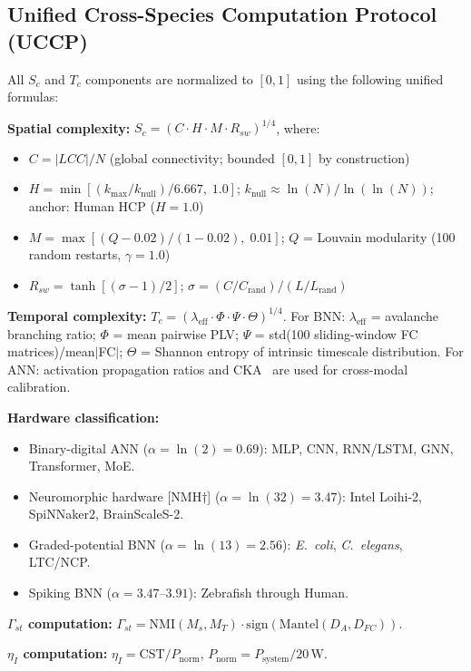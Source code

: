 \documentclass[12pt]{article}
\newcommand{\CST}{\mathrm{CST}}
\newcommand{\Sc}{S_c}
\newcommand{\Tc}{T_c}
\newcommand{\Gst}{\Gamma_{st}}
\newcommand{\etaI}{\eta_I}
\begin{document}
\subsection{Unified Cross-Species Computation Protocol (UCCP)}

All $\Sc$ and $\Tc$ components are normalized to $[0, 1]$ using the following unified formulas:

\textbf{Spatial complexity:} $\Sc = (C \cdot H \cdot M \cdot R_{sw})^{1/4}$, where:
\begin{itemize}
\item $C = |LCC|/N$ (global connectivity; bounded $[0,1]$ by construction)
\item $H = \min[(k_{\max} / k_{\mathrm{null}}) / 6.667,\; 1.0]$; $k_{\mathrm{null}} \approx \ln(N)/\ln(\ln(N))$; anchor: Human HCP ($H = 1.0$)
\item $M = \max[(Q - 0.02) / (1 - 0.02),\; 0.01]$; $Q$ = Louvain modularity (100 random restarts, $\gamma = 1.0$)
\item $R_{sw} = \tanh[(\sigma - 1) / 2]$; $\sigma = (C/C_{\mathrm{rand}})/(L/L_{\mathrm{rand}})$
\end{itemize}

\textbf{Temporal complexity:} $\Tc = (\lambda_{\mathrm{eff}} \cdot \Phi \cdot \Psi \cdot \Theta)^{1/4}$. For BNN: $\lambda_{\mathrm{eff}}$ = avalanche branching ratio; $\Phi$ = mean pairwise PLV; $\Psi$ = std(100 sliding-window FC matrices)/mean$|$FC$|$; $\Theta$ = Shannon entropy of intrinsic timescale distribution. For ANN: activation propagation ratios and CKA~\cite{raghu2021} are used for cross-modal calibration.

\textbf{Hardware classification:}
\begin{itemize}
\item Binary-digital ANN ($\alpha = \ln(2) = 0.69$): MLP, CNN, RNN/LSTM, GNN, Transformer, MoE.
\item Neuromorphic hardware [NMH$\dagger$] ($\alpha = \ln(32) = 3.47$): Intel Loihi-2, SpiNNaker2, BrainScaleS-2.
\item Graded-potential BNN ($\alpha = \ln(13) = 2.56$): \textit{E.\ coli}, \textit{C.\ elegans}, LTC/NCP.
\item Spiking BNN ($\alpha = 3.47$--$3.91$): Zebrafish through Human.
\end{itemize}

\textbf{$\Gst$ computation:} $\Gst = \mathrm{NMI}(M_s, M_T) \cdot \mathrm{sign}(\mathrm{Mantel}(D_A, D_{FC}))$.

\textbf{$\etaI$ computation:} $\etaI = \CST / P_{\mathrm{norm}}$, $P_{\mathrm{norm}} = P_{\mathrm{system}} / 20\,\mathrm{W}$.
\end{document}
